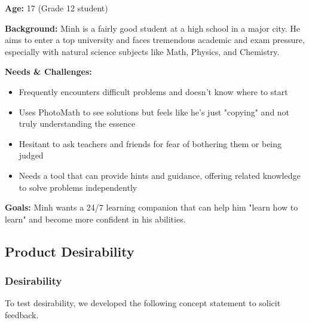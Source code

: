 \textbf{Age:} 17 (Grade 12 student)

\textbf{Background:} Minh is a fairly good student at a high school in a major city. He aims to enter a top university and faces tremendous academic and exam pressure, especially with natural science subjects like Math, Physics, and Chemistry.

\textbf{Needs \& Challenges:}
\begin{itemize}
    \item Frequently encounters difficult problems and doesn't know where to start
    \item Uses PhotoMath to see solutions but feels like he's just "copying" and not truly understanding the essence
    \item Hesitant to ask teachers and friends for fear of bothering them or being judged
    \item Needs a tool that can provide hints and guidance, offering related knowledge to solve problems independently
\end{itemize}

\textbf{Goals:} Minh wants a 24/7 learning companion that can help him "learn how to learn" and become more confident in his abilities.

\subsection{Product Desirability}
\subsubsection{Desirability}
To test desirability, we developed the following concept statement to solicit feedback.

\medskip

